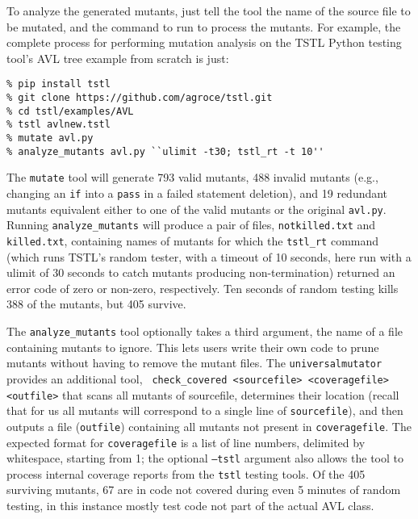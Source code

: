 To analyze the generated mutants, just tell the tool the name of the
source file to be mutated, and the command to run to process the
mutants.  For example, the complete process for performing mutation
analysis on the TSTL \cite{tstlsttt,nfm15} Python testing tool's AVL tree example from scratch is just:


\begin{verbatim}
% pip install tstl
% git clone https://github.com/agroce/tstl.git
% cd tstl/examples/AVL
% tstl avlnew.tstl
% mutate avl.py
% analyze_mutants avl.py ``ulimit -t30; tstl_rt -t 10''
\end{verbatim}

The {\tt mutate} tool will generate 793 valid mutants, 488 invalid
mutants (e.g., changing an {\tt if} into a {\tt pass} in a failed
statement deletion), and 19 redundant mutants equivalent either to one
of the valid mutants or the original {\tt avl.py}.
Running {\tt analyze\_mutants} will produce a pair of files, {\tt notkilled.txt} and {\tt
  killed.txt}, containing names of mutants for which the {\tt tstl\_rt}
command (which runs TSTL's random tester, with a timeout of 10
seconds, here run with a ulimit of 30 seconds to catch mutants
producing non-termination)
returned an error code of zero or non-zero, respectively.  Ten seconds
of random testing kills 388 of the mutants, but 405 survive.

The {\tt analyze\_mutants} tool optionally takes a third argument, the
name of a file containing mutants to ignore.  This lets users write
their own code to prune mutants without having to remove the mutant
files.  The {\tt universalmutator} provides an additional tool, {\tt
  check\_covered <sourcefile> <coveragefile> <outfile>} that scans all
mutants of sourcefile, determines their location (recall that for us all mutants will correspond to a single line
of {\tt sourcefile}), and then outputs a file ({\tt outfile})
containing all mutants not present in {\tt coveragefile}.  The
expected format for {\tt coveragefile} is a list of line numbers,
delimited by whitespace, starting from 1; the optional {\tt --tstl}
argument also allows the tool to process internal coverage reports
from the {\tt tstl} testing tools.  Of the 405 surviving mutants, 67
are in code not covered during even 5 minutes of random testing, in
this instance mostly test code not part of the actual AVL class.
